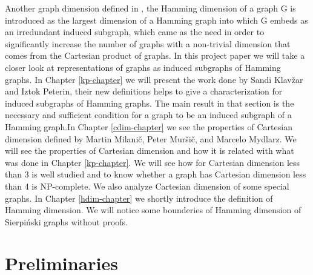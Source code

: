 \documentclass[12pt,a4paper,titlepage,openany]{report}
\begin{document}
Another graph dimension defined in \cite{Sandi}, the Hamming dimension of a graph G is introduced as the largest dimension of a Hamming graph into which G embeds as an irredundant induced subgraph, which came as the need in order to significantly increase the number of graphs with a non-trivial dimension that comes from the Cartesian product of graphs.
\newline
In this project paper we will take a closer look at representations of graphs as induced subgraphs of Hamming graphs. In Chapter \ref{kp-chapter} we will present the work done by Sandi Klav\v zar and Iztok Peterin, their new definitions helps to give a characterization for induced
subgraphs of Hamming graphs. The main result in that section is the necessary and sufficient condition for a graph to be an induced subgraph of a Hamming graph.\newline In Chapter \ref{cdim-chapter} we see the properties of Cartesian dimension defined by Martin Milani\v c, Peter Mur\v si\v c, and Marcelo Mydlarz. We will see the properties of Cartesian dimension and how it is related with what was done in Chapter \ref{kp-chapter}. We will see how for Cartesian dimension less than 3 is well studied and to know whether a graph has Cartesian dimension less than 4 is NP-complete. We also analyze Cartesian dimension of some special graphs.\newline
In Chapter \ref{hdim-chapter} we shortly introduce the definition of Hamming dimension. We will notice some bounderies of Hamming dimension of Sierpi\'nski graphs without proofs.



\chapter{Preliminaries}
\thispagestyle{fancy}
\end{document}
